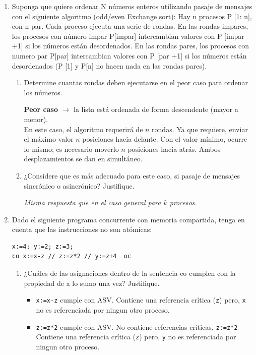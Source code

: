 \documentclass[a4paper, 10pt]{article}
\newenvironment{QandA}{
    \begin{enumerate}\bfseries}
    {\end{enumerate}
}
\newenvironment{answered}{\par\normalfont}{}
\begin{document}
\begin{QandA}
\item Suponga que quiere ordenar N números enteros utilizando pasaje de mensajes con el siguiente algoritmo (odd/even Exchange sort): Hay  n procesos P [1: n], con n par. Cada proceso ejecuta una serie de rondas. En las rondas impares, los procesos con número impar P[impar] intercambian valores con P [impar +1] si los números están desordenados. En las rondas pares, los procesos con numero par P[par] intercambian valores con P [par +1] si los números están desordenados (P [1] y P[n] no hacen nada en las rondas pares).
\begin{enumerate}
    \item Determine cuantas rondas deben ejecutarse en el peor caso para ordenar los números.
    \begin{answered}
        \textbf{Peor caso} $\rightarrow$ la lista está ordenada de forma descendente (mayor a menor).
        \\
        En este caso, el algoritmo requerirá de $n$ rondas. Ya que requiere, enviar el máximo valor $n$ posiciones hacia delante. Con el valor mínimo, ocurre lo mismo; es necesario moverlo $n$ posiciones hacia atrás. Ambos desplazamientos se dan en simultáneo.
    \end{answered}
    \item ¿Considere que es más adecuado para este caso, si pasaje de mensajes sincrónico o asincrónico? Justifique.
    \begin{answered}
        \emph{Misma respuesta que en el caso general para $k$ procesos.}
    \end{answered}
\end{enumerate}

\item Dado el siguiente programa concurrente con memoria compartida, tenga en cuenta que las instrucciones no son atómicas:
\\
\begin{lstlisting}
x:=4; y:=2; z:=3;
co x:=x-z // z:=z*2 // y:=z+4  oc
\end{lstlisting}
\begin{enumerate}
\item ¿Cuáles de las asignaciones dentro de la sentencia co cumplen con la propiedad de a lo sumo una vez? Justifique. 
\begin{answered}
\begin{itemize}
    \item \lstinline{x:=x-z} cumple con ASV. Contiene una referencia crítica (\lstinline{z}) pero, \lstinline{x} no es referenciada por ningun otro proceso.
    \item \lstinline{z:=z*2} cumple con ASV. No contiene referencias críticas.
    \lstinline{z:=z*2} Contiene una referencia crítica (\lstinline{z}) pero, \lstinline{y} no es referenciada por ningun otro proceso.
\end{itemize}    
\end{answered}
\end{enumerate}


\end{QandA}
\end{document}
